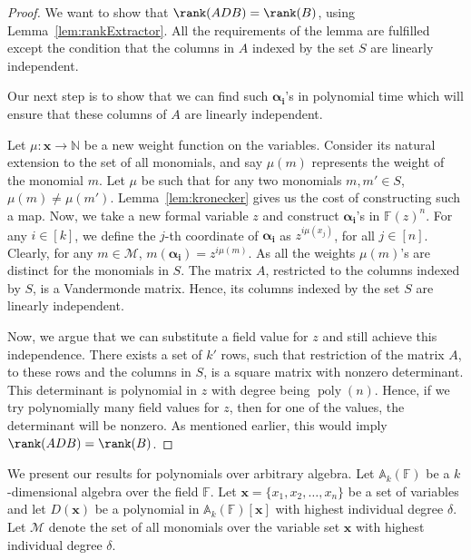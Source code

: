 \documentclass[final,oneeqnum, onethmnum, onefignum]{siamltex1213}
\newcommand{\N}{\mathbb N}
\newcommand{\A}{\mathbb A}
\newcommand{\F}{\mathbb F}
\newcommand{\M}{\mathcal M}
\newcommand{\degree}{\delta} %
\DeclareMathOperator{\poly}{poly}
\newcommand{\x}{\mathbf{x}}
\begin{document}
{\begin{proof}
We want to show that $\rank(ADB) = \rank(B)$, using Lemma~\ref{lem:rankExtractor}. 
All the requirements of the lemma are fulfilled except the condition that
the columns in $A$ indexed by the set $S$ are linearly independent.

Our next step is to show that we can find such $\boldsymbol{ \alpha_i}$'s in polynomial
 time which will ensure that these columns of $A$ are linearly independent.

Let $\mu \colon {\mathbf x} \to \N$ be a new weight function on the variables.
Consider its natural extension to the set of all monomials, and say
$\mu(m)$ represents the weight of the monomial $m$.
Let $\mu$ be such that for any two monomials $m, m' \in S$,
$\mu(m) \neq \mu({m'})$. 
Lemma~\ref{lem:kronecker} gives us the cost of constructing such a map.
Now, we take a new formal variable $z$ and construct $\boldsymbol{ \alpha_i}$'s
in $\F(z)^n$. 
For any $i \in [k]$, we define the $j$-th coordinate of $\boldsymbol{\alpha_i}$
as $z^{i \mu(x_j)}$, for all $j \in [n]$.
Clearly, for any $m \in \M$, $m(\boldsymbol{ \alpha_i}) = z^{i \mu(m)}$.
As all the weights $\mu(m)$'s are distinct for the monomials in $S$.
The matrix $A$, restricted to the columns indexed by $S$, is a 
Vandermonde matrix. 
Hence, its columns indexed by the set $S$ are linearly independent.

Now, we argue that we can substitute a field value for $z$ and
still achieve this independence.
There exists a set of $k'$ rows, such that 
restriction of the matrix $A$, to these rows and 
the columns in $S$, is a square matrix with nonzero
determinant. 
This determinant is polynomial in $z$ with degree being $\poly(n)$.
Hence, if we try polynomially many field values for $z$, then
for one of the values, the determinant will be nonzero. 
As mentioned earlier, this would imply $\rank(ADB) = \rank(B)$.
\end{proof}

}

We present our results for polynomials over arbitrary algebra.
Let $\A_k(\F)$ be a $k$-dimensional algebra over the field $\F$. 
Let $\mathbf{x} = \{x_1, x_2, \dots, x_n\}$ be a set of variables and
let $D(\mathbf{x})$ be a polynomial in $\A_k(\F)[\x]$ with highest individual 
degree $\degree$. 
Let $\M$ denote the set of all monomials over the variable set ${\mathbf x}$
with highest individual degree $\degree$.
\end{document}
